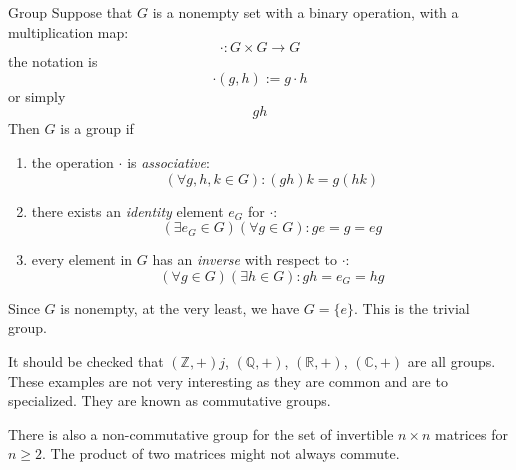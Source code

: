 \documentclass{report}
\begin{document}
\begin{definition}[\label{def:2.1.2}]{Group}
    Suppose that $G$ is a nonempty set with a binary operation, with a multiplication map:
        \begin{equation*}
            \cdot : G \times G \rightarrow G
        \end{equation*}
    the notation is
        \begin{equation*}
            \cdot(g, h) := g \cdot h
        \end{equation*}
    or simply 
        \begin{equation*}
            gh
        \end{equation*}
    Then $G$ is a group if 
        \begin{enumerate}
            \item the operation $\cdot$ is \textit{associative}:
                \begin{equation*}
                    (\forall g, h, k \in G): (gh)k = g(hk)
                \end{equation*}

            \item there exists an \textit{identity} element $e_{G}$ for $\cdot$:
                \begin{equation*}
                    (\exists e_{G} \in G)(\forall g \in G) : ge = g = eg
                \end{equation*}

            \item every element in $G$ has an \textit{inverse} with respect to $\cdot$:
                \begin{equation*}
                    (\forall g \in G)(\exists h \in G) : gh = e_{G} = hg
                \end{equation*}
        \end{enumerate}
\end{definition}

\begin{examples}
    \begin{example}[\label{exm:2.1.3}]
        Since $G$ is nonempty, at the very least, we have $G = \{e\}$. This is the trivial group.
    \end{example}

    \begin{example}[\label{exm:2.1.4}]
        It should be checked that $(\mathbb{Z}, +)j$, $(\mathbb{Q}, +)$, $(\mathbb{R}, +)$, $(\mathbb{C}, +)$ are all groups. These examples are not very interesting as they are common and are to specialized. They are known as commutative groups.
    \end{example}

    \begin{example}[\label{exm:2.1.5}]
        There is also a non-commutative group for the set of invertible $n \times n$ matrices for $n \geq 2$. The product of two matrices might not always commute.
    \end{example}
\end{examples}
\end{document}
